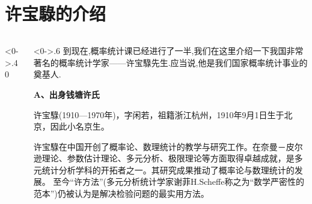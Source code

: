 \section*{许宝騄的介绍}
\begin{frame}
	\begin{columns}[T] %
		\begin{column}<0->{.40\textwidth}
			\begin{figure}[thpb]
				\centering
				\caption{许宝騄}
				\label{fig:campus}
			\end{figure}
		\end{column}%
		\hfill%
		\begin{column}<0->{.6\textwidth}
			到现在,概率统计课已经进行了一半,我们在这里介绍一下我国非常著名的概率统计学家——许宝騄先生.应当说,他是我们国家概率统计事业的奠基人.
			
			\textbf{A、出身钱塘许氏}
			
			许宝騄(1910—1970年)，字闲若，祖籍浙江杭州，1910年9月1日生于北京，因此小名京生。
			
			许宝騄在中国开创了概率论、数理统计的教学与研究工作。在奈曼－皮尔逊理论、参数估计理论、多元分析、极限理论等方面取得卓越成就，是多元统计分析学科的开拓者之一。其研究成果推动了概率论与数理统计的发展。 至今“许方法”(多元分析统计学家谢菲H.Scheffe称之为“数学严密性的范本”)仍被认为是解决检验问题的最实用方法。
		\end{column}%
	\end{columns}
	
\end{frame}

